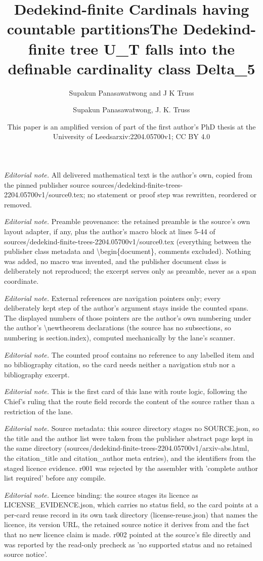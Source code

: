 \documentclass[10pt,a4paper]{amsart}
\title{Dedekind-finite Cardinals having countable partitions}
\author{Supakun Panasawatwong and J K Truss}
\date{This paper is an amplified version of part of the first author's PhD thesis at the University of Leeds}%
\title{The Dedekind-finite tree U\_T falls into the definable cardinality class Delta\_5}
\author{Supakun Panasawatwong, J. K. Truss}
\date{arxiv:2204.05700v1; CC BY 4.0}
\begin{document}
\maketitle
\noindent\textit{Editorial note.} All delivered mathematical text is the author's own, copied from the pinned publisher source sources/dedekind-finite-trees-2204.05700v1/source0.tex; no statement or proof step was rewritten, reordered or removed.\par\medskip
\noindent\textit{Editorial note.} Preamble provenance: the retained preamble is the source's own layout adapter, if any, plus the author's macro block at lines 5-44 of sources/dedekind-finite-trees-2204.05700v1/source0.tex (everything between the publisher class metadata and \textbackslash{}begin\{document\}, comments excluded). Nothing was added, no macro was invented, and the publisher document class is deliberately not reproduced; the excerpt serves only as preamble, never as a span coordinate.\par\medskip
\noindent\textit{Editorial note.} External references are navigation pointers only; every deliberately kept step of the author's argument stays inside the counted spans. The displayed numbers of those pointers are the author's own numbering under the author's \textbackslash{}newtheorem declarations (the source has no subsections, so numbering is section.index), computed mechanically by the lane's scanner.\par\medskip
\noindent\textit{Editorial note.} The counted proof contains no reference to any labelled item and no bibliography citation, so the card needs neither a navigation stub nor a bibliography excerpt.\par\medskip
\noindent\textit{Editorial note.} This is the first card of this lane with route logic, following the Chief's ruling that the route field records the content of the source rather than a restriction of the lane.\par\medskip
\noindent\textit{Editorial note.} Source metadata: this source directory stages no SOURCE.json, so the title and the author list were taken from the publisher abstract page kept in the same directory (sources/dedekind-finite-trees-2204.05700v1/arxiv-abs.html, the citation\_title and citation\_author meta entries), and the identifiers from the staged licence evidence. r001 was rejected by the assembler with 'complete author list required' before any compile.\par\medskip
\noindent\textit{Editorial note.} Licence binding: the source stages its licence as LICENSE\_EVIDENCE.json, which carries no status field, so the card points at a per-card reuse record in its own task directory (license-reuse.json) that names the licence, its version URL, the retained source notice it derives from and the fact that no new licence claim is made. r002 pointed at the source's file directly and was reported by the read-only precheck as 'no supported status and no retained source notice'.\par\medskip
\end{document}
